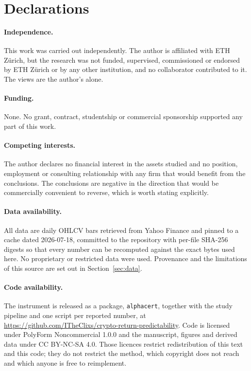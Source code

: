 \documentclass{article}
\theoremstyle{plain}
\theoremstyle{definition}
\begin{document}
\section*{Declarations}

\paragraph{Independence.} This work was carried out independently. The author is affiliated
with ETH Z\"urich, but the research was not funded, supervised, commissioned or endorsed by
ETH Z\"urich or by any other institution, and no collaborator contributed to it. The views
are the author's alone.

\paragraph{Funding.} None. No grant, contract, studentship or commercial sponsorship
supported any part of this work.

\paragraph{Competing interests.} The author declares no financial interest in the assets
studied and no position, employment or consulting relationship with any firm that would
benefit from the conclusions. The conclusions are negative in the direction that would be
commercially convenient to reverse, which is worth stating explicitly.

\paragraph{Data availability.} All data are daily OHLCV bars retrieved from Yahoo Finance and
pinned to a cache dated 2026-07-18, committed to the repository with per-file SHA-256 digests
so that every number can be recomputed against the exact bytes used here. No proprietary or
restricted data were used. Provenance and the limitations of this source are set out in
Section~\ref{sec:data}.

\paragraph{Code availability.} The instrument is released as a package, \texttt{alphacert},
together with the study pipeline and one script per reported number, at
\url{https://github.com/ITheClixs/crypto-return-predictability}. Code is licensed under
PolyForm Noncommercial 1.0.0 and the manuscript, figures and derived data under
CC BY-NC-SA 4.0. Those licences restrict redistribution of this text and this code; they do
not restrict the method, which copyright does not reach and which anyone is free to
reimplement.
\end{document}
